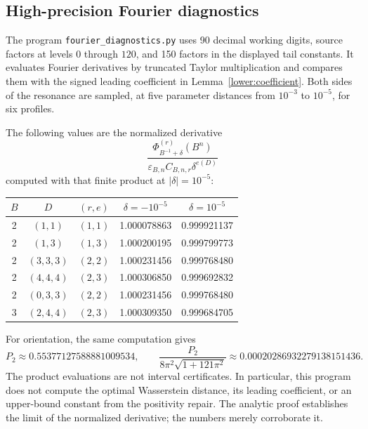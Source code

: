 \documentclass[11pt,letterpaper]{article}
\theoremstyle{definition}
\theoremstyle{remark}
\begin{document}
\subsection{High-precision Fourier diagnostics}
The program \texttt{fourier\_diagnostics.py} uses 90 decimal working digits, source factors at levels $0$ through $120$, and 150 factors in the displayed tail constants. It evaluates Fourier derivatives by truncated Taylor multiplication and compares them with the signed leading coefficient in Lemma~\ref{lower:coefficient}. Both sides of the resonance are sampled, at five parameter distances from $10^{-3}$ to $10^{-5}$, for six profiles.

The following values are the normalized derivative
\[
 \frac{\Phi_{B^{-1}+\delta}^{(r)}(B^n)}
 {\varepsilon_{B,n}C_{B,n,r}\delta^{e(D)}}
\]
computed with that finite product at $|\delta|=10^{-5}$:
\begin{center}
\begin{tabular}{ccccc}
\toprule
$B$ & $D$ & $(r,e)$ & $\delta=-10^{-5}$ & $\delta=10^{-5}$\\
\midrule
2 & $(1,1)$ & $(1,1)$ & 1.000078863 & 0.999921137\\
2 & $(1,3)$ & $(1,3)$ & 1.000200195 & 0.999799773\\
2 & $(3,3,3)$ & $(2,2)$ & 1.000231456 & 0.999768480\\
2 & $(4,4,4)$ & $(2,3)$ & 1.000306850 & 0.999692832\\
2 & $(0,3,3)$ & $(2,2)$ & 1.000231456 & 0.999768480\\
3 & $(2,4,4)$ & $(2,3)$ & 1.000309350 & 0.999684705\\
\bottomrule
\end{tabular}
\end{center}
For orientation, the same computation gives
\[
 P_2\approx0.55377127588881009534,
 \qquad
 \frac{P_2}{8\pi^2\sqrt{1+121\pi^2}}
 \approx0.00020286932279138151436.
\]
The product evaluations are not interval certificates. In particular, this program does not compute the optimal Wasserstein distance, its leading coefficient, or an upper-bound constant from the positivity repair. The analytic proof establishes the limit of the normalized derivative; the numbers merely corroborate it.
\end{document}
